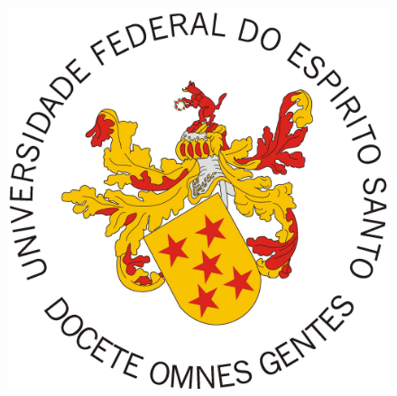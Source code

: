 \documentclass[
	12pt,				%
	openright,			%
	oneside,
	a4paper,			%
	english,			%
	french,				%
	spanish,			%
	brazil				%
	]{abntex2}
\begin{document}
\frenchspacing


\begin{figure}[h]
  \centering
  \includegraphics[scale=0.055]{figuras/brasao.jpg}
  \label{ppts3}
  \end{figure} 

\imprimircapa

\imprimirfolhaderosto*



%     
\end{document}
